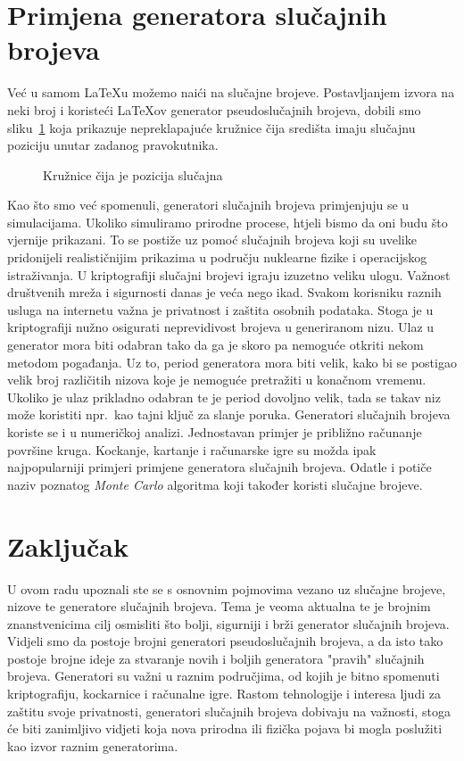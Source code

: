 \documentclass[10pt]{scrartcl}
\newcommand\foreign[1]{\textit{#1}}
\def\xlist{4}
\def\ylist{4}
\newcommand{\fillrandomly}[4]{
    \pgfmathsetmacro\diameter{#3*2}
    \draw (0,0) rectangle (#1,#2);
    \foreach \i in {1,...,#4}{
        \pgfmathsetmacro\x{rnd*#1}
        \pgfmathsetmacro\y{rnd*#2}
        \xdef\collision{0}
        \foreach \element [count=\i] in \xlist{
            \pgfmathtruncatemacro\j{\i-1}
            \pgfmathsetmacro\checkdistance{ sqrt( ({\xlist}[\j]-(\x))^2 + ({\ylist}[\j]-(\y))^2 ) }
            \ifdim\checkdistance pt<\diameter pt
                \xdef\collision{1}
                \breakforeach
            \fi
        }
        \ifnum\collision=0
            \xdef\xlist{\xlist,\x}
            \xdef\ylist{\ylist,\y}
            \draw [red, thick] (\x,\y) circle [radius=#3];
        \fi 
    }
}
\begin{document}
\section{Primjena generatora slučajnih brojeva}
Već u samom \LaTeX u možemo naići na slučajne brojeve. Postavljanjem izvora na neki broj i koristeći \LaTeX ov generator pseudoslučajnih brojeva, dobili smo sliku~\ref{fig:kruznice} koja prikazuje nepreklapajuće kružnice čija središta imaju slučajnu poziciju unutar zadanog pravokutnika.
\begin{figure}[H]
\centering
{}
\caption{Kružnice čija je pozicija slučajna}
\label{fig:kruznice}
\end{figure}
Kao što smo već spomenuli, generatori slučajnih brojeva primjenjuju se u simulacijama. Ukoliko simuliramo prirodne procese, htjeli bismo da oni budu što vjernije prikazani. To se postiže uz pomoć slučajnih brojeva koji su uvelike pridonijeli realističnijim prikazima u području nuklearne fizike i operacijskog istraživanja. U kriptografiji slučajni brojevi igraju izuzetno veliku ulogu. Važnost društvenih mreža i sigurnosti danas je veća nego ikad. Svakom korisniku raznih usluga na internetu važna je privatnost i zaštita osobnih podataka. Stoga je u kriptografiji nužno osigurati neprevidivost brojeva u generiranom nizu. Ulaz u generator mora biti odabran tako da ga je skoro pa nemoguće otkriti nekom metodom pogađanja. Uz to, period generatora mora biti velik, kako bi se postigao velik broj različitih nizova koje je nemoguće pretražiti u konačnom vremenu. Ukoliko je ulaz prikladno odabran te je period dovoljno velik, tada se takav niz može koristiti npr.\ kao tajni ključ za slanje poruka. Generatori slučajnih brojeva koriste se i u numeričkoj analizi. Jednostavan primjer je približno računanje površine kruga. Kockanje, kartanje i računarske igre su možda ipak najpopularniji primjeri primjene generatora slučajnih brojeva. Odatle i potiče naziv poznatog \foreign{Monte Carlo} algoritma koji također koristi slučajne brojeve. 

\section{Zaključak}
U ovom radu upoznali ste se s osnovnim pojmovima vezano uz slučajne brojeve, nizove te generatore slučajnih brojeva. Tema je veoma aktualna te je brojnim znanstvenicima cilj osmisliti što bolji, sigurniji i brži generator slučajnih brojeva. Vidjeli smo da postoje brojni generatori pseudoslučajnih brojeva, a da isto tako postoje brojne ideje za stvaranje novih i boljih generatora "pravih" slučajnih brojeva. Generatori su važni u raznim područjima, od kojih je bitno spomenuti kriptografiju, kockarnice i računalne igre. Rastom tehnologije i interesa ljudi za zaštitu svoje privatnosti, generatori slučajnih brojeva dobivaju na važnosti, stoga će biti zanimljivo vidjeti koja nova prirodna ili fizička pojava bi mogla poslužiti kao izvor raznim generatorima. 


\pagebreak[4]

\printbibliography
\nocite{*}
\end{document}

